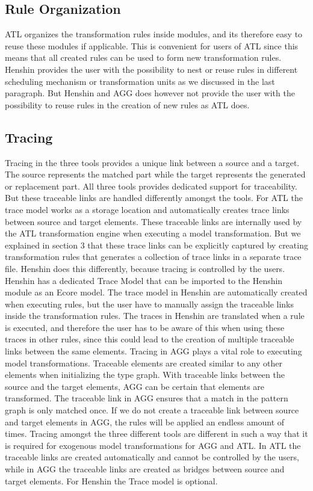 \subsection{Rule Organization}

ATL organizes the transformation rules inside modules, and its therefore easy to
reuse these modules if applicable. This is convenient for
users of ATL since this means that all created rules can be used to form new
transformation rules. Henshin provides the user with the possibility to nest or 
reuse rules in different scheduling mechanism or transformation units
as we discussed in the last paragraph. But Henshin and AGG does however not
provide the user with the possibility to reuse rules in the creation of new
rules as ATL does. 

\subsection{Tracing}

Tracing in the three tools provides a unique link
between a source and a target. The source represents the matched part while the
target represents the generated or replacement part. All three tools provides
dedicated support for traceability. But these traceable links are handled
differently amongst the tools. For ATL the trace model works as a storage
location and automatically creates trace links between source and target
elements. These traceable links are internally used by the ATL
transformation engine when executing a model transformation. But we explained in
section 3 that these trace links can be explicitly captured by creating
transformation rules that generates a collection of trace links in a
separate trace file. Henshin does this differently, because tracing is
controlled by the users. Henshin has a dedicated Trace Model that can be
imported to the Henshin module as an Ecore model. The trace model in Henshin
are automatically created when executing rules, but the user have to manually
assign the traceable links inside the transformation rules. The traces in
Henshin are translated when a rule is executed, and therefore the user has to
be aware of this when using these traces in other rules, since this
could lead to the creation of multiple traceable links between the same
elements. Tracing in AGG plays a vital role to executing model transformations.
Traceable elements are created similar to any other elements when initializing
the type graph. With traceable links between the source and the
target elements, AGG can be certain that elements are transformed. The traceable
link in AGG ensures that a match in the pattern graph is only matched once. If we do
not create a traceable link between source and target elements in AGG, the
rules will be applied an endless amount of times. Tracing amongst the three
different tools are different in such a way that it is required for exogenous
model transformations for AGG and ATL. In ATL the traceable links are created
automatically and cannot be controlled by the users, while in AGG the traceable
links are created as bridges between source and target elements. For Henshin
the Trace model is optional. 

